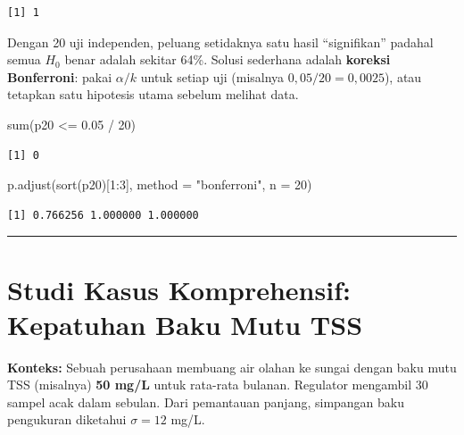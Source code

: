 \documentclass[
  indonesian,
  letterpaper,
]{book}
\newenvironment{Shaded}{\begin{snugshade}}{\end{snugshade}}
\newcommand{\AttributeTok}[1]{\textcolor[rgb]{0.40,0.45,0.13}{#1}}
\newcommand{\DecValTok}[1]{\textcolor[rgb]{0.68,0.00,0.00}{#1}}
\newcommand{\FloatTok}[1]{\textcolor[rgb]{0.68,0.00,0.00}{#1}}
\newcommand{\FunctionTok}[1]{\textcolor[rgb]{0.28,0.35,0.67}{#1}}
\newcommand{\NormalTok}[1]{\textcolor[rgb]{0.00,0.23,0.31}{#1}}
\newcommand{\SpecialCharTok}[1]{\textcolor[rgb]{0.37,0.37,0.37}{#1}}
\newcommand{\StringTok}[1]{\textcolor[rgb]{0.13,0.47,0.30}{#1}}
\begin{document}
\begin{verbatim}
[1] 1
\end{verbatim}

Dengan 20 uji independen, peluang setidaknya satu hasil ``signifikan''
padahal semua \(H_0\) benar adalah sekitar 64\%. Solusi sederhana adalah
\textbf{koreksi Bonferroni}: pakai \(\alpha/k\) untuk setiap uji
(misalnya \(0{,}05/20 = 0{,}0025\)), atau tetapkan satu hipotesis utama
sebelum melihat data.

\begin{Shaded}
\begin{Highlighting}[]
\FunctionTok{sum}\NormalTok{(p20 }\SpecialCharTok{\textless{}=} \FloatTok{0.05} \SpecialCharTok{/} \DecValTok{20}\NormalTok{)}
\end{Highlighting}
\end{Shaded}

\begin{verbatim}
[1] 0
\end{verbatim}

\begin{Shaded}
\begin{Highlighting}[]
\FunctionTok{p.adjust}\NormalTok{(}\FunctionTok{sort}\NormalTok{(p20)[}\DecValTok{1}\SpecialCharTok{:}\DecValTok{3}\NormalTok{], }\AttributeTok{method =} \StringTok{"bonferroni"}\NormalTok{, }\AttributeTok{n =} \DecValTok{20}\NormalTok{)}
\end{Highlighting}
\end{Shaded}

\begin{verbatim}
[1] 0.766256 1.000000 1.000000
\end{verbatim}

\begin{center}\rule{0.5\linewidth}{0.5pt}\end{center}


\chapter{Studi Kasus Komprehensif: Kepatuhan Baku Mutu
TSS}\label{studi-kasus-komprehensif-kepatuhan-baku-mutu-tss}

\textbf{Konteks:} Sebuah perusahaan membuang air olahan ke sungai dengan
baku mutu TSS (misalnya) \textbf{50 mg/L} untuk rata-rata bulanan.
Regulator mengambil 30 sampel acak dalam sebulan. Dari pemantauan
panjang, simpangan baku pengukuran diketahui \(\sigma = 12\) mg/L.
\end{document}
